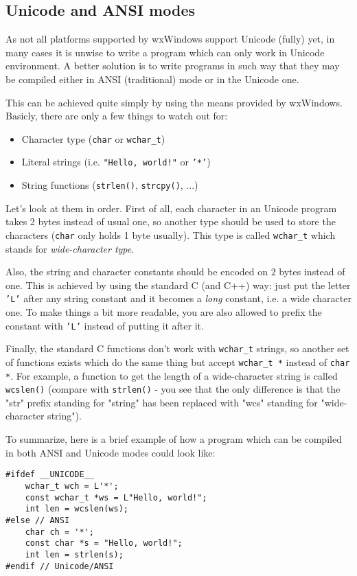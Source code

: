 \subsection{Unicode and ANSI modes}

As not all platforms supported by wxWindows support Unicode (fully) yet, in
many cases it is unwise to write a program which can only work in Unicode
environment. A better solution is to write programs in such way that they may
be compiled either in ANSI (traditional) mode or in the Unicode one.

This can be achieved quite simply by using the means provided by wxWindows.
Basicly, there are only a few things to watch out for:
\begin{itemize}
\item Character type ({\tt char} or {\tt wchar\_t})
\item Literal strings (i.e. {\tt "Hello, world!"} or {\tt '*'})
\item String functions ({\tt strlen()}, {\tt strcpy()}, ...)
\end{itemize}

Let's look at them in order. First of all, each character in an Unicode
program takes 2 bytes instead of usual one, so another type should be used to
store the characters ({\tt char} only holds 1 byte usually). This type is
called {\tt wchar\_t} which stands for {\it wide-character type}.

Also, the string and character constants should be encoded on 2 bytes instead
of one. This is achieved by using the standard C (and C++) way: just put the
letter {\tt 'L'} after any string constant and it becomes a {\it long}
constant, i.e. a wide character one. To make things a bit more readable, you
are also allowed to prefix the constant with {\tt 'L'} instead of putting it
after it.

Finally, the standard C functions don't work with {\tt wchar\_t} strings, so
another set of functions exists which do the same thing but accept 
{\tt wchar\_t *} instead of {\tt char *}. For example, a function to get the
length of a wide-character string is called {\tt wcslen()} (compare with 
{\tt strlen()} - you see that the only difference is that the "str" prefix
standing for "string" has been replaced with "wcs" standing for
"wide-character string").

To summarize, here is a brief example of how a program which can be compiled
in both ANSI and Unicode modes could look like:

\begin{verbatim}
#ifdef __UNICODE__
    wchar_t wch = L'*';
    const wchar_t *ws = L"Hello, world!";
    int len = wcslen(ws);
#else // ANSI
    char ch = '*';
    const char *s = "Hello, world!";
    int len = strlen(s);
#endif // Unicode/ANSI
\end{verbatim}

